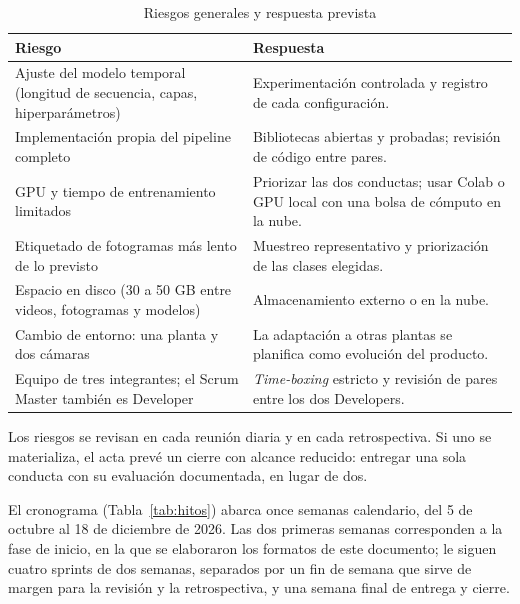 \documentclass[12pt,a4paper]{article}
\newenvironment{tablaapa}{\small\singlespacing\renewcommand{\arraystretch}{1.25}}{}
\begin{document}
\begin{table}[!htbp]
\caption{Riesgos generales y respuesta prevista}\label{tab:riesgos}
\begin{tablaapa}
\begin{tabularx}{\textwidth}{P{5.2cm} L}
\toprule
Riesgo & Respuesta\\
\midrule
Ajuste del modelo temporal (longitud de secuencia, capas, hiperparámetros) & Experimentación controlada y registro de cada configuración.\\
Implementación propia del pipeline completo & Bibliotecas abiertas y probadas; revisión de código entre pares.\\
GPU y tiempo de entrenamiento limitados & Priorizar las dos conductas; usar Colab o GPU local con una bolsa de cómputo en la nube.\\
Etiquetado de fotogramas más lento de lo previsto & Muestreo representativo y priorización de las clases elegidas.\\
Espacio en disco (30 a 50 GB entre videos, fotogramas y modelos) & Almacenamiento externo o en la nube.\\
Cambio de entorno: una planta y dos cámaras & La adaptación a otras plantas se planifica como evolución del producto.\\
Equipo de tres integrantes; el Scrum Master también es Developer & \textit{Time-boxing} estricto y revisión de pares entre los dos Developers.\\
\bottomrule
\end{tabularx}
\end{tablaapa}
\end{table}

Los riesgos se revisan en cada reunión diaria y en cada retrospectiva. Si uno se materializa, el acta prevé un cierre con alcance reducido: entregar una sola conducta con su evaluación documentada, en lugar de dos.

El cronograma (Tabla~\ref{tab:hitos}) abarca once semanas calendario, del 5 de octubre al 18 de diciembre de 2026. Las dos primeras semanas corresponden a la fase de inicio, en la que se elaboraron los formatos de este documento; le siguen cuatro sprints de dos semanas, separados por un fin de semana que sirve de margen para la revisión y la retrospectiva, y una semana final de entrega y cierre.
\end{document}
